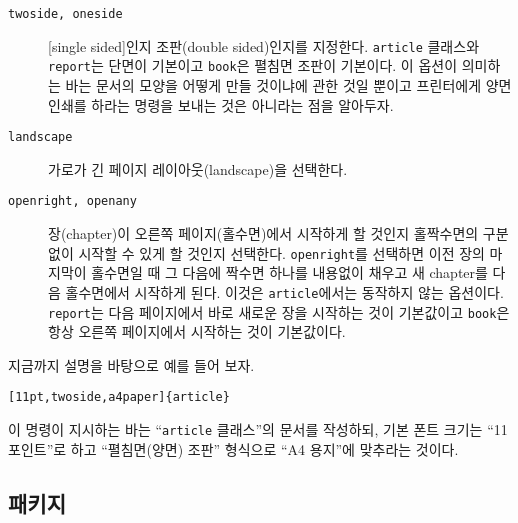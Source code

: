 \begin{table}[!bp]
\begin{lined}{\textwidth}
\begin{description}
\item[\normalfont\texttt{twoside, oneside}] \quad 
  [single sided]인지  조판(double sided)인지를 지정한다. \texttt{article} 클래스와 \texttt{report}는
  단면이 기본이고 \texttt{book}은 펼침면 조판이 기본이다.
  이 옵션이 의미하는 바는 문서의 모양을 어떻게 만들 것이냐에 관한 것일 뿐이고 
  프린터에게 양면인쇄를 하라는 명령을 보내는 것은 아니라는 점을 알아두자.
\item[\normalfont\texttt{landscape}] \quad 
  가로가 긴 페이지 레이아웃(landscape)을 선택한다.
\item[\normalfont\texttt{openright, openany}] \quad 
  장(chapter)이 오른쪽 페이지(홀수면)에서 시작하게 할 것인지 홀짝수면의 구분 없이
  시작할 수 있게 할 것인지 선택한다. \texttt{openright}를 선택하면 이전 장의 마지막이 홀수면일 때
  그 다음에 짝수면 하나를 내용없이 채우고 새 chapter를 다음 홀수면에서 시작하게 된다.
  이것은 \texttt{article}에서는 동작하지 않는 옵션이다. \texttt{report}는 다음 페이지에서
  바로 새로운 장을 시작하는 것이 기본값이고 \texttt{book}은 항상 오른쪽 페이지에서 시작하는 것이
  기본값이다.

\end{description}
\end{lined}
\end{table}



지금까지 설명을 바탕으로 예를 들어 보자.
\begin{code}
\verb|[11pt,twoside,a4paper]{article}|
\end{code}
이 명령이 지시하는 바는 ``\texttt{article} 클래스''의 문서를 작성하되, 기본 폰트 크기는 ``11포인트''로 하고 
``펼침면(양면) 조판'' 형식으로 ``A4 용지''에 맞추라는 것이다.

\subsection{패키지} 

